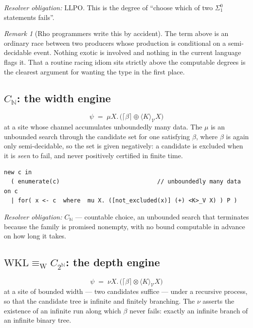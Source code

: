 \documentclass[11pt]{article}
\theoremstyle{definition}
\theoremstyle{plain}
\theoremstyle{remark}
\newtheorem{remark}{Remark}
\newcommand{\V}{\mathcal{V}}
\newcommand{\sumv}{\oplus}
\newcommand{\tensorv}{\otimes}
\newcommand{\crisp}[1]{\lceil #1 \rceil}
\newcommand{\LLPO}{\mathrm{LLPO}}
\newcommand{\WKL}{\mathrm{WKL}}
\newcommand{\ew}{\equiv_{\mathrm{W}}}
\newcommand{\Can}{2^{\mathbb{N}}}
\begin{document}
\emph{Resolver obligation:} $\LLPO$. This is the degree of ``choose which of two
$\Sigma^0_1$ statements fails''.

\begin{remark}[Rho programmers write this by accident]\label{rem:accident}
The term above is an ordinary race between two producers whose production is
conditional on a semi-decidable event. Nothing exotic is involved and nothing in the
current language flags it. That a routine racing idiom sits strictly above the
computable degrees is the clearest argument for wanting the type in the first place.
\end{remark}

\subsection{$C_{\mathbb{N}}$: the width engine}\label{ssec:cn}

\[
  \psi \;=\; \mu X.\, \big( \crisp{\beta} \sumv \langle K \rangle_\V X \big)
\]
at a site whose channel accumulates unboundedly many data. The $\mu$ is an unbounded
search through the candidate set for one satisfying $\beta$, where $\beta$ is again
only semi-decidable, so the set is given negatively: a candidate is excluded when it is
\emph{seen} to fail, and never positively certified in finite time.

\begin{lstlisting}
new c in
  ( enumerate(c)                            // unboundedly many data on c
  | for( x <- c  where  mu X. ([not_excluded(x)] (+) <K>_V X) ) P )
\end{lstlisting}

\emph{Resolver obligation:} $C_{\mathbb{N}}$ --- countable choice, an unbounded search
that terminates because the family is promised nonempty, with no bound computable in
advance on how long it takes.

\subsection{$\WKL \ew C_{\Can}$: the depth engine}\label{ssec:wkl}

\[
  \psi \;=\; \nu X.\, \big( \crisp{\beta} \tensorv \langle K \rangle_\V X \big)
\]
at a site of bounded width --- two candidates suffice --- under a recursive process, so
that the candidate tree is infinite and finitely branching. The $\nu$ asserts the
existence of an infinite run along which $\beta$ never fails: exactly an infinite
branch of an infinite binary tree.
\end{document}
